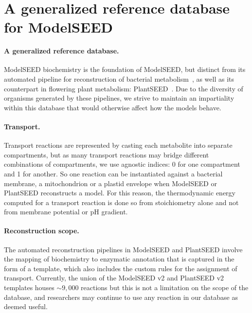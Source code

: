\section{A generalized reference database for ModelSEED}\label{sec:s6}

\paragraph{A generalized reference database.}
ModelSEED biochemistry is the foundation of ModelSEED, but distinct from its automated pipeline for reconstruction of bacterial metabolism~\cite{henry2010,faria2023}, as well as its counterpart in flowering plant metabolism: PlantSEED~\cite{seaver2014,seaver2018}. Due to the diversity of organisms generated by these pipelines, we strive to maintain an impartiality within this database that would otherwise affect how the models behave.

\paragraph{Transport.} Transport reactions are represented by casting each metabolite into separate compartments, but as many transport reactions may bridge different combinations of compartments, we use agnostic indices: 0 for one compartment and 1 for another. So one reaction can be instantiated against a bacterial membrane, a mitochondrion or a plastid envelope when ModelSEED or PlantSEED reconstructs a model. For this reason, the thermodynamic energy computed for a transport reaction is done so from stoichiometry alone and not from membrane potential or pH gradient.

\paragraph{Reconstruction scope.} The automated reconstruction pipelines in ModelSEED and PlantSEED involve the mapping of biochemistry to enzymatic annotation that is captured in the form of a template, which also includes the custom rules for the assignment of transport. Currently, the union of the ModelSEED v2 and PlantSEED v2 templates houses $\sim9,000$ reactions but this is not a limitation on the scope of the database, and researchers may continue to use any reaction in our database as deemed useful.
